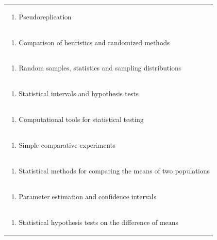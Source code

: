 \documentclass[11pt]{article}
\begin{document}
\begin{center}
\begin{longtable}{|p{4cm}|p{4cm}|p{4cm}|p{4cm}|}
\multicolumn{4}{|p{\dimexpr 16cm + 6\tabcolsep\relax}|}{\begin{enumerate}[start=10]\item Pseudoreplication\end{enumerate}}\\
\multicolumn{4}{|p{\dimexpr 16cm + 6\tabcolsep\relax}|}{\begin{enumerate}[start=11]\item Comparison of heuristics and randomized methods\end{enumerate}}\\
\multicolumn{4}{|p{\dimexpr 16cm + 6\tabcolsep\relax}|}{\begin{enumerate}[start=12]\item Random samples, statistics and sampling distributions\end{enumerate}}\\
\multicolumn{4}{|p{\dimexpr 16cm + 6\tabcolsep\relax}|}{\begin{enumerate}[start=13]\item Statistical intervals and hypothesis tests\end{enumerate}}\\
\multicolumn{4}{|p{\dimexpr 16cm + 6\tabcolsep\relax}|}{\begin{enumerate}[start=14]\item Computational tools for statistical testing\end{enumerate}}\\
\multicolumn{4}{|p{\dimexpr 16cm + 6\tabcolsep\relax}|}{\begin{enumerate}[start=15]\item Simple comparative experiments\end{enumerate}}\\
\multicolumn{4}{|p{\dimexpr 16cm + 6\tabcolsep\relax}|}{\begin{enumerate}[start=16]\item Statistical methods for comparing the means of two populations\end{enumerate}}\\
\multicolumn{4}{|p{\dimexpr 16cm + 6\tabcolsep\relax}|}{\begin{enumerate}[start=17]\item Parameter estimation and confidence intervals\end{enumerate}}\\
\multicolumn{4}{|p{\dimexpr 16cm + 6\tabcolsep\relax}|}{\begin{enumerate}[start=18]\item Statistical hypothesis tests on the difference of means\end{enumerate}}\\

\end{longtable}
\end{center}
\end{document}
